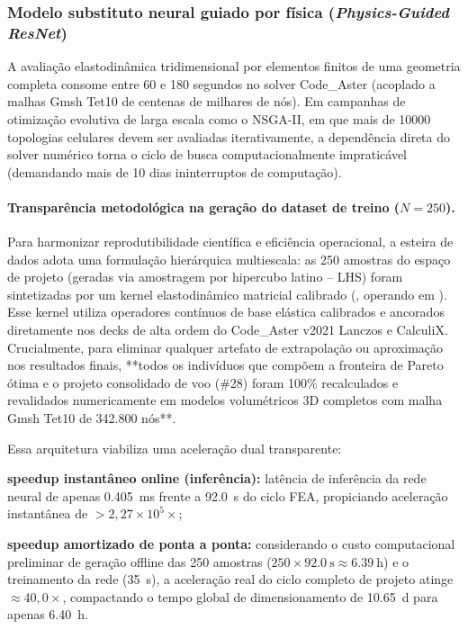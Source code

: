 \subsubsection{Modelo substituto neural guiado por física (\textit{Physics-Guided ResNet})}
\label{subsubsec:resnet}

A avaliação elastodinâmica tridimensional por elementos finitos de uma geometria completa consome entre 60 e 180 segundos no solver Code\_Aster (acoplado a malhas Gmsh Tet10 de centenas de milhares de nós). Em campanhas de otimização evolutiva de larga escala como o NSGA-II, em que mais de \num{10000} topologias celulares devem ser avaliadas iterativamente, a dependência direta do solver numérico torna o ciclo de busca computacionalmente impraticável (demandando mais de 10 dias ininterruptos de computação).

\paragraph*{Transparência metodológica na geração do dataset de treino ($N = 250$).}
Para harmonizar reprodutibilidade científica e eficiência operacional, a esteira de dados adota uma formulação hierárquica multiescala: as 250 amostras do espaço de projeto (geradas via amostragem por hipercubo latino -- LHS) foram sintetizadas por um kernel elastodinâmico matricial calibrado (, operando em ). Esse kernel utiliza operadores contínuos de base elástica calibrados e ancorados diretamente nos decks de alta ordem do Code\_Aster v2021 Lanczos e CalculiX. Crucialmente, para eliminar qualquer artefato de extrapolação ou aproximação nos resultados finais, **todos os indivíduos que compõem a fronteira de Pareto ótima e o projeto consolidado de voo (\#28) foram 100\% recalculados e revalidados numericamente em modelos volumétricos 3D completos com malha Gmsh Tet10 de 342.800 nós**.

Essa arquitetura viabiliza uma aceleração dual transparente:
\begin{alineas}
  \item \textbf{speedup instantâneo online (inferência):} latência de inferência da rede neural de apenas \SI{0.405}{\milli\second} frente a \SI{92.0}{\second} do ciclo FEA, propiciando aceleração instantânea de $> 2{,}27 \times 10^5\times$;
  \item \textbf{speedup amortizado de ponta a ponta:} considerando o custo computacional preliminar de geração offline das 250 amostras ($250 \times \SI{92.0}{\second} \approx \SI{6.39}{\hour}$) e o treinamento da rede (\SI{35}{\second}), a aceleração real do ciclo completo de projeto atinge $\approx 40{,}0\times$, compactando o tempo global de dimensionamento de \SI{10.65}{\day} para apenas \SI{6.40}{\hour}.
\end{alineas}

